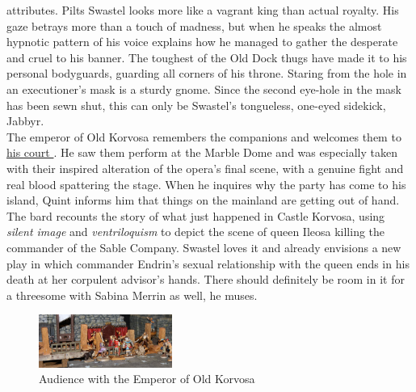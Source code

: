 attributes. Pilts Swastel looks more like a vagrant king than actual royalty. His gaze betrays more than a touch of madness, but when he speaks the almost hypnotic pattern of his voice explains how he managed to gather the desperate and cruel to his banner. The toughest of the Old Dock thugs have made it to his personal bodyguards, guarding all corners of his throne. Staring from the hole in an executioner's mask is a sturdy gnome. Since the second eye-hole in the mask has been sewn shut, this can only be Swastel's tongueless, one-eyed sidekick, Jabbyr.\\

The emperor of Old Korvosa remembers the companions and welcomes them to\hyperref[fig:Audience-with-the-Emperor-of-Old-Korvosa-548846605]{ his court } . He saw them perform at the Marble Dome and was especially taken with their inspired alteration of the opera's final scene, with a genuine fight and real blood spattering the stage. When he inquires why the party has come to his island, Quint informs him that things on the mainland are getting out of hand. The bard recounts the story of what just happened in Castle Korvosa, using  {\itshape silent image} and  {\itshape ventriloquism} to depict the scene of queen Ileosa killing the commander of the Sable Company. Swastel loves it and already envisions a new play in which commander Endrin's sexual relationship with the queen ends in his death at her corpulent advisor's hands. There should definitely be room in it for a threesome with Sabina Merrin as well, he muses. \\

\begin{figure}[h]
	\centering
	\includegraphics[width=0.39\textwidth]{images/Audience-with-the-Emperor-of-Old-Korvosa-548846605.jpg}
	\caption{Audience with the Emperor of Old Korvosa}
	\label{fig:Audience-with-the-Emperor-of-Old-Korvosa-548846605}
\end{figure}


